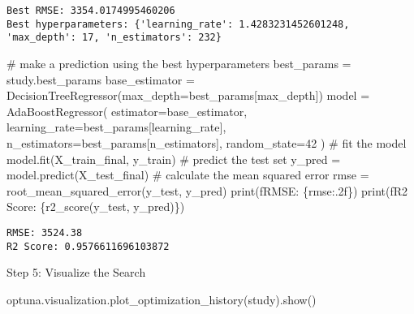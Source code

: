 \documentclass[
  letterpaper,
  DIV=11,
  numbers=noendperiod]{scrreprt}
\newenvironment{Shaded}{\begin{snugshade}}{\end{snugshade}}
\newcommand{\BuiltInTok}[1]{\textcolor[rgb]{0.00,0.23,0.31}{#1}}
\newcommand{\CommentTok}[1]{\textcolor[rgb]{0.37,0.37,0.37}{#1}}
\newcommand{\DecValTok}[1]{\textcolor[rgb]{0.68,0.00,0.00}{#1}}
\newcommand{\NormalTok}[1]{\textcolor[rgb]{0.00,0.23,0.31}{#1}}
\newcommand{\OperatorTok}[1]{\textcolor[rgb]{0.37,0.37,0.37}{#1}}
\newcommand{\SpecialCharTok}[1]{\textcolor[rgb]{0.37,0.37,0.37}{#1}}
\newcommand{\SpecialStringTok}[1]{\textcolor[rgb]{0.13,0.47,0.30}{#1}}
\newcommand{\StringTok}[1]{\textcolor[rgb]{0.13,0.47,0.30}{#1}}
\begin{document}
\begin{verbatim}
Best RMSE: 3354.0174995460206
Best hyperparameters: {'learning_rate': 1.4283231452601248, 'max_depth': 17, 'n_estimators': 232}
\end{verbatim}

\begin{Shaded}
\begin{Highlighting}[]
\CommentTok{\# make a prediction using the best hyperparameters}
\NormalTok{best\_params }\OperatorTok{=}\NormalTok{ study.best\_params}
\NormalTok{base\_estimator }\OperatorTok{=}\NormalTok{ DecisionTreeRegressor(max\_depth}\OperatorTok{=}\NormalTok{best\_params[}\StringTok{\textquotesingle{}max\_depth\textquotesingle{}}\NormalTok{])}
\NormalTok{model }\OperatorTok{=}\NormalTok{ AdaBoostRegressor(}
\NormalTok{    estimator}\OperatorTok{=}\NormalTok{base\_estimator,}
\NormalTok{    learning\_rate}\OperatorTok{=}\NormalTok{best\_params[}\StringTok{\textquotesingle{}learning\_rate\textquotesingle{}}\NormalTok{],}
\NormalTok{    n\_estimators}\OperatorTok{=}\NormalTok{best\_params[}\StringTok{\textquotesingle{}n\_estimators\textquotesingle{}}\NormalTok{],}
\NormalTok{    random\_state}\OperatorTok{=}\DecValTok{42}
\NormalTok{)}
\CommentTok{\# fit the model}
\NormalTok{model.fit(X\_train\_final, y\_train)}
\CommentTok{\# predict the test set}
\NormalTok{y\_pred }\OperatorTok{=}\NormalTok{ model.predict(X\_test\_final)}
\CommentTok{\# calculate the mean squared error}
\NormalTok{rmse }\OperatorTok{=}\NormalTok{ root\_mean\_squared\_error(y\_test, y\_pred)}
\BuiltInTok{print}\NormalTok{(}\SpecialStringTok{f\textquotesingle{}RMSE: }\SpecialCharTok{\{}\NormalTok{rmse}\SpecialCharTok{:.2f\}}\SpecialStringTok{\textquotesingle{}}\NormalTok{)}
\BuiltInTok{print}\NormalTok{(}\SpecialStringTok{f\textquotesingle{}R2 Score: }\SpecialCharTok{\{}\NormalTok{r2\_score(y\_test, y\_pred)}\SpecialCharTok{\}}\SpecialStringTok{\textquotesingle{}}\NormalTok{)}
\end{Highlighting}
\end{Shaded}

\begin{verbatim}
RMSE: 3524.38
R2 Score: 0.9576611696103872
\end{verbatim}

Step 5: Visualize the Search

\begin{Shaded}
\begin{Highlighting}[]
\NormalTok{optuna.visualization.plot\_optimization\_history(study).show()}
\end{Highlighting}
\end{Shaded}
\end{document}
